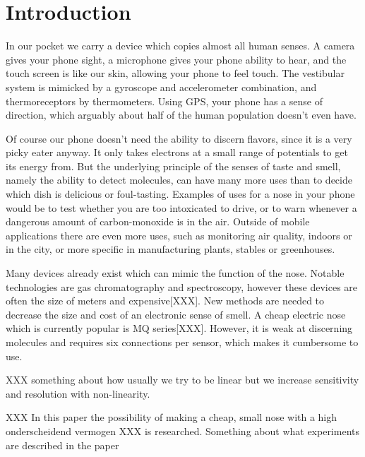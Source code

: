 \clearpage\section{Introduction}
In our pocket we carry a device which copies almost all human senses. A camera gives your phone sight, a microphone gives your phone ability to hear, and the touch screen is like our skin, allowing your phone to feel touch. The vestibular system is mimicked by a gyroscope and accelerometer combination, and thermoreceptors by thermometers. Using GPS, your phone has a sense of direction, which arguably about half of the human population doesn't even have. 

Of course our phone doesn't need the ability to discern flavors, since it is a very picky eater anyway. It only takes electrons at a small range of potentials to get its energy from. But the underlying principle of the senses of taste and smell, namely the ability to detect molecules, can have many more uses than to decide which dish is delicious or foul-tasting. Examples of uses for a nose in your phone would be to test whether you are too intoxicated to drive, or to warn whenever a dangerous amount of carbon-monoxide is in the air. Outside of mobile applications there are even more uses, such as monitoring air quality, indoors or in the city, or more specific in manufacturing plants, stables or greenhouses.

Many devices already exist which can mimic the function of the nose. Notable technologies are gas chromatography and spectroscopy, however these devices are often the size of meters and expensive[XXX]. New methods are needed to decrease the size and cost of an electronic sense of smell. A cheap electric nose which is currently popular is MQ series[XXX]. However, it is weak at discerning molecules and requires six connections per sensor, which makes it cumbersome to use. 

XXX something about how usually we try to be linear but we increase sensitivity and resolution with non-linearity.

XXX In this paper the possibility of making a cheap, small nose with a high onderscheidend vermogen XXX is researched. Something about what experiments are described in the paper